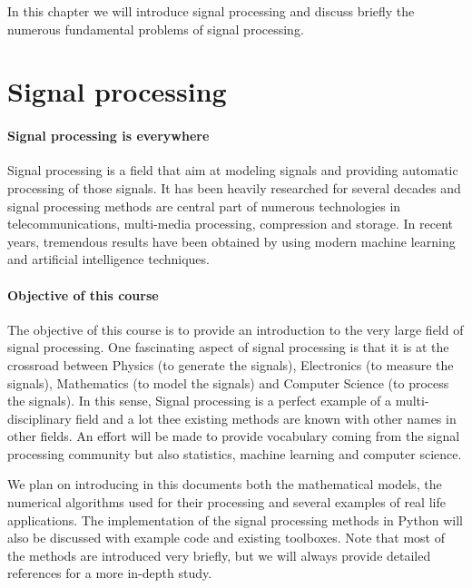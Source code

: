 
In this chapter we will introduce signal processing and discuss briefly the
numerous fundamental problems of signal processing. 

\section{Signal processing}
\label{sec:sigpro-intro}


\paragraph{Signal processing is everywhere}
Signal processing is a field that aim at modeling signals and providing automatic
processing of those signals. 
It has been heavily researched for several decades
and signal processing methods are central part of numerous technologies in
telecommunications, multi-media processing, compression and storage. 
In recent
years, tremendous results have been obtained by using modern machine learning
and artificial intelligence techniques.

\paragraph{Objective of this course} The objective of this course is to provide
an introduction to the very large field of signal processing. 
One fascinating
aspect of signal processing is that it is at the crossroad between Physics (to
generate the signals), Electronics (to measure the signals), Mathematics (to
model the signals) and Computer Science (to process the signals). In this sense,
Signal processing is a perfect example of a
multi-disciplinary field and a lot thee existing methods are known with other
names in other fields. An effort will be made to provide vocabulary coming from
the signal processing community but also statistics, machine learning and
computer science.

We plan on
introducing in this documents both the mathematical models, the numerical
algorithms used for their processing and several examples of real life
applications. The implementation of the signal processing methods in Python will
also be discussed with example code and existing
toolboxes. Note that most of the methods are introduced very briefly, but we
will always provide detailed references for a more in-depth study.



